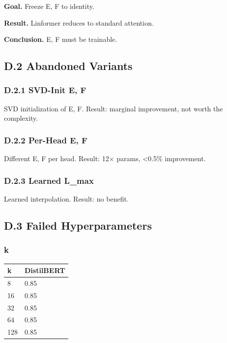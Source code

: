 \textbf{Goal.} Freeze E, F to identity.

\textbf{Result.} Linformer reduces to standard attention.

\textbf{Conclusion.} E, F must be trainable.

\subsection{D.2 Abandoned Variants}

\subsubsection{D.2.1 SVD-Init E, F}

SVD initialization of E, F. Result: marginal improvement, not worth the 
complexity.

\subsubsection{D.2.2 Per-Head E, F}

Different E, F per head. Result: 12$\times$ params, \textless{}0.5\% improvement.

\subsubsection{D.2.3 Learned L\_max}

Learned interpolation. Result: no benefit.

\subsection{D.3 Failed Hyperparameters}

\subsubsection{k}

\begin{table}[H]
\centering
\small
\begin{tabular}{ll}
\toprule
\textbf{k} & \textbf{DistilBERT} \\
\midrule
8 & 0.85 \\
16 & 0.85 \\
32 & 0.85 \\
64 & 0.85 \\
128 & 0.85 \\
\bottomrule
\end{tabular}
\end{table}


